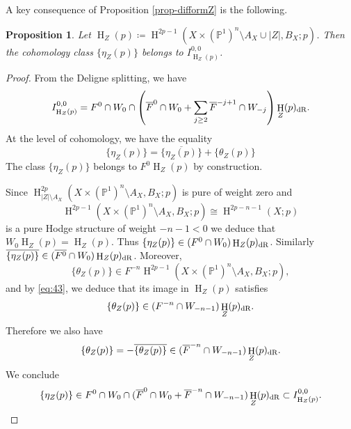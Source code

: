 \documentclass[11pt,a4paper]{amsart}
\newcommand{\dR}{\text{\rm dR}}
\renewcommand{\P}{\mathds{P}}
\DeclareMathOperator{\rH}{H}
\numberwithin{equation}{section}
\theoremstyle{plain}
\newtheorem{prop}{Proposition}[section]
\theoremstyle{definition}
\begin{document}
A key consequence of Proposition \ref{prop-difformZ} is the following. 
\begin{prop}\label{i-p-q}
Let $\rH_{Z}(p)\coloneqq \rH^{2p-1}(X\times (\P^1)^{n}\setminus
A_{X}\cup |Z|, B_{X}; p)$. Then the cohomology class
$\{\eta_{Z}(p)\}$
belongs to $I^{0,0}_{\rH_{Z}(p)}$. 
 \end{prop}
\begin{proof}
From the Deligne splitting, we have
\begin{displaymath}
I^{0,0}_{\rH_{Z}(p)}=F^{0}\cap W_{0}\cap \left(\overline{F}^{0}\cap W_{0} +\sum_{j\ge 2} \overline{F}^{-j+1}\cap W_{-j}\right)\rH_{Z}(p)_{\dR}.
\end{displaymath}
At the level of cohomology, we have the equality
\begin{displaymath}
  \{\eta_{Z}(p)\}=\overline{\{\eta_{Z}(p)\}} +\{\theta_{Z}(p)\}
\end{displaymath}
 The
class $\{\eta_{Z}(p)\}$ belongs to
$F^{0}\rH_{Z}(p)$ by construction.

Since 
$\rH^{2p}_{|Z|\setminus A_{X}}(X\times (\P^1)^{n}\setminus A_{X},
B_{X}; p)$ is pure of weight zero and  
\begin{equation}\label{eq:43}
\rH^{2p-1}(X\times (\P^1)^{n}\setminus A_{X}, B_{X}; p)\cong \rH^{2p-n-1}(X; p)
\end{equation}
is a pure Hodge structure of weight $-n-1<0$ we deduce that
$W_{0}\rH_{Z}(p)=\rH_{Z}(p)$. Thus $\{\eta_{Z}(p)\}\in (F^{0}\cap
W_0)\rH_{Z}(p)_{\dR}$. Similarly 
 $\overline{\{\eta_{Z}(p)\}}\in
(\overline{F^{0}}\cap W_{0})\rH_{Z}(p)_{\dR}$.
Moreover, 
\begin{displaymath}
  \{\theta_{Z}(p)\}\in F^{-n}\rH^{2p-1}(X\times
  (\P^1)^{n}\setminus A_{X}, B_{X}; p),
\end{displaymath}
and by \eqref{eq:43}, we deduce
that its image in $\rH_{Z}(p)$ satisfies 
\begin{displaymath}
\{\theta_{Z}(p)\}\in (F^{-n}\cap W_{-n-1})\rH_{Z}(p)_{\dR}.
\end{displaymath}
Therefore we also have
\begin{displaymath}
\{\theta_{Z}(p)\}=-\overline{\{\theta_{Z}(p)\}}\in (\overline{F}^{-n}\cap 
W_{-n-1})\rH_{Z}(p)_{\dR}.
\end{displaymath}
We conclude
\begin{displaymath}
\{\eta_{Z}(p)\}\in F^{0}\cap W_{0}\cap (\overline{F}^{0}\cap W_{0}+
\overline{F}^{-n}\cap W_{-n-1})\rH_{Z}(p)_{\dR}\subset
I^{0,0}_{\rH_{Z}(p)}. 
\end{displaymath}
\end{proof}
\end{document}
